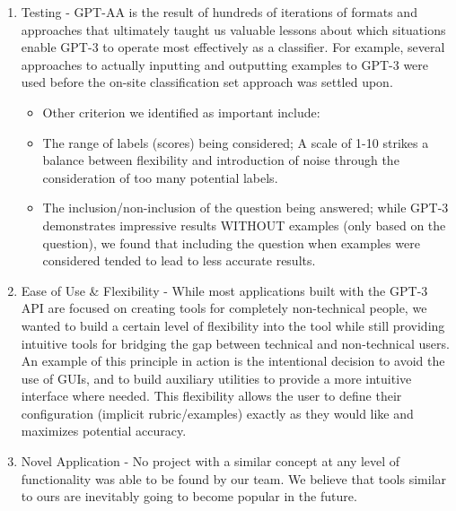 \documentclass[
]{article}
\begin{document}
\begin{enumerate}
\def\labelenumi{\arabic{enumi}.}
\itemsep1pt\parskip0pt
\item
  Testing - GPT-AA is the result of hundreds of iterations of formats
  and approaches that ultimately taught us valuable lessons about which
  situations enable GPT-3 to operate most effectively as a classifier.
  For example, several approaches to actually inputting and outputting
  examples to GPT-3 were used before the on-site classification set
  approach was settled upon.

  \begin{itemize}
  \itemsep1pt\parskip0pt
  \item
    Other criterion we identified as important include:
  \item
    The range of labels (scores) being considered; A scale of 1-10
    strikes a balance between flexibility and introduction of noise
    through the consideration of too many potential labels.
  \item
    The inclusion/non-inclusion of the question being answered; while
    GPT-3 demonstrates impressive results WITHOUT examples (only based
    on the question), we found that including the question when examples
    were considered tended to lead to less accurate results.
  \end{itemize}
\item
  Ease of Use \& Flexibility - While most applications built with the
  GPT-3 API are focused on creating tools for completely non-technical
  people, we wanted to build a certain level of flexibility into the
  tool while still providing intuitive tools for bridging the gap
  between technical and non-technical users. An example of this
  principle in action is the intentional decision to avoid the use of
  GUIs, and to build auxiliary utilities to provide a more intuitive
  interface where needed. This flexibility allows the user to define
  their configuration (implicit rubric/examples) exactly as they would
  like and maximizes potential accuracy.
\item
  Novel Application - No project with a similar concept at any level of
  functionality was able to be found by our team. We believe that tools
  similar to ours are inevitably going to become popular in the future.
\end{enumerate}
\end{document}
